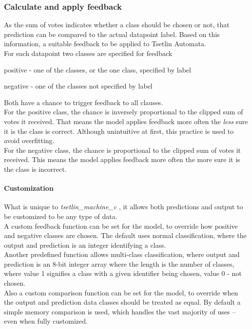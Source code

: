 \documentclass[english]{aghengthesis} %
\newcommand*{\LibraryName}{\emph{tsetlin\_machine\_c }}
\begin{document}
\subsubsection{Calculate and apply feedback}
As the sum of votes indicates whether a class should be chosen or not, that prediction can be compared to the actual datapoint label. Based on this information, a suitable feedback to be applied to Tsetlin Automata. \\
For each datapoint two classes are specified for feedback
\begin{compactenum}
    \item positive - one of the classes, or the one class, specified by label
    \item negative - one of the classes not specified by label
\end{compactenum}
Both have a chance to trigger feedback to all clauses. \\
For the positive class, the chance is inversely proportional to the clipped sum of votes it received. That means the model applies feedback more often the \textit{less} sure it is the class is correct. Although unintuitive at first, this practice is used to avoid overfitting. \\
For the negative class, the chance is proportional to the clipped sum of votes it received. This means the model applies feedback more often the more sure it is the class is incorrect. \\

\paragraph{Customization}
What is unique to \LibraryName, it allows both predictions and output to be customized to be any type of data. \\
A custom feedback function can be set for the model, to override how positive and negative classes are chosen. The default uses normal classification, where the output and prediction is an integer identifying a class. \\
Another predefined function allows multi-class classification, where output and prediction is an 8-bit integer array where the length is the number of classes, where value 1 signifies a class with a given identifier being chosen, value 0 - not chosen. \\
\vspace{7pt}
Also a custom comparison function can be set for the model, to override when the output and prediction data classes should be treated as equal. By default a simple memory comparison is used, which handles the vast majority of uses -- even when fully customized.
\end{document}
